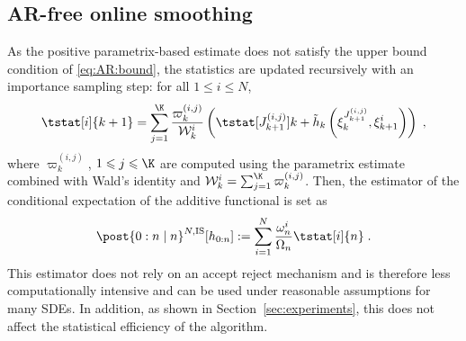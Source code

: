 \documentclass{article}
\newcommand{\af}[1]{h_{#1}}
\newcommand{\addf}[1]{\termletter_{#1}}
\newcommand{\termletter}{\tilde{h}}
\newcommand{\N}{N}
\newcommand{\hkup}{\bar{\varepsilon}}
\newcommand{\bi}[3]{J_{#1}^{(#2, #3)}}
\newcommand{\eqdef}{\ensuremath{:=}}
\newcommand{\eqsp}{\;}
\newcommand{\ewght}[2]{\ensuremath{\omega_{#1}^{#2}}}
\newcommand{\epart}[2]{\ensuremath{\xi_{#1}^{#2}}}
\newcommand{\sumwght}[2][]{%
\ifthenelse{\equal{#1}{}}{\ensuremath{\Omega_{#2}}}{\ensuremath{\Omega_{#2}^{(#1)}}}}
\newcommand{\kernelmarg}{\mathbf{R}}
\newcommand{\hatqg}[1]{\mathsf{\ell}_{#1}}
\begin{document}
\subsection{AR-free online smoothing}
As the positive parametrix-based estimate does not satisfy the upper bound condition of \eqref{eq:AR:bound}, the statistics are updated recursively with an importance sampling step: for all $1\leqslant i\leqslant \N$,
\begin{equation}
\label{eq:update:paris:marginal:is}
\tstat[i]{k+1} =\sum_{j=1}^{\K}\frac{\varpi_k^{(i,j)}}{\mathcal{W}_k^i}\left( \tstat[\bi{k+1}{i}{j}]{k} + \addf{k}\left(\epart{k}{\bi{k+1}{i}{j}}, \epart{k+1}{i}\right)\right)\eqsp,
\end{equation}
where $\varpi_k^{(i,j)}$, $1\leqslant j \leqslant \K$ are computed using the parametrix estimate combined with Wald's identity and $\mathcal{W}_k^i = \sum_{j=1}^{\K} \varpi_k^{(i,j)}$.
Then, the estimator of the conditional expectation of the additive functional is set as
\[
\post{0:n\mid n}^{\N,\textrm{IS}} [\af{0:n}] \eqdef \sum_{i=1}^{\N}\frac{\ewght{n}{i}}{\sumwght{n}}\tstat[i]{n}\eqsp.
\]
This estimator does not rely on an accept reject mechanism and is therefore less computationally intensive and can be used under reasonable assumptions for many SDEs. In addition, as shown in Section~\ref{sec:experiments}, this does not affect the statistical efficiency of the algorithm.
\end{document}
